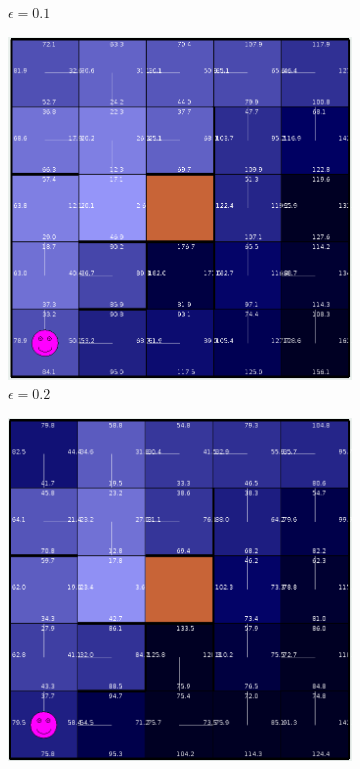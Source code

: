 \documentclass[letterpaper]{article}
\begin{document}
\begin{figure}
\begin{subfigure}{.3\textwidth}
			\caption{$\epsilon = 0.1$}
		\end{subfigure}
		\begin{subfigure}{.3\textwidth}
			\centering
			\includegraphics[width=\linewidth]{images/small_ql_02}
			\caption{$\epsilon = 0.2$}
		\end{subfigure}
		\begin{subfigure}{.3\textwidth}
			\centering
			\includegraphics[width=\linewidth]{images/small_ql_03}

\end{subfigure}
\end{figure}
\end{document}
